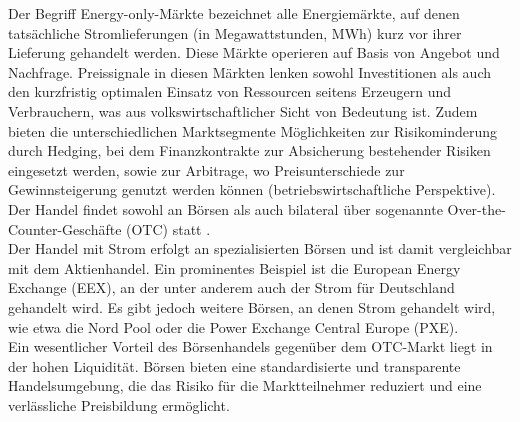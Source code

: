 Der Begriff Energy-only-Märkte bezeichnet alle Energiemärkte, auf denen tatsächliche Stromlieferungen (in Megawattstunden, MWh) kurz vor ihrer Lieferung gehandelt werden. Diese Märkte operieren auf Basis von Angebot und Nachfrage. Preissignale in diesen Märkten lenken sowohl Investitionen als auch den kurzfristig optimalen Einsatz von Ressourcen seitens Erzeugern und Verbrauchern, was aus volkswirtschaftlicher Sicht von Bedeutung ist. Zudem bieten die unterschiedlichen Marktsegmente Möglichkeiten zur Risikominderung durch Hedging, bei dem Finanzkontrakte zur Absicherung bestehender Risiken eingesetzt werden, sowie zur Arbitrage, wo Preisunterschiede zur Gewinnsteigerung genutzt werden können (betriebswirtschaftliche Perspektive). Der Handel findet sowohl an Börsen als auch bilateral über sogenannte Over-the-Counter-Geschäfte (OTC) statt \cite{VDI5207Blatt2020}.\\

Der Handel mit Strom erfolgt an spezialisierten Börsen und ist damit vergleichbar mit dem Aktienhandel. Ein prominentes Beispiel ist die European Energy Exchange (EEX), an der unter anderem auch der Strom für Deutschland gehandelt wird. Es gibt jedoch weitere Börsen, an denen Strom gehandelt wird, wie etwa die Nord Pool oder die Power Exchange Central Europe (PXE).\\

Ein wesentlicher Vorteil des Börsenhandels gegenüber dem OTC-Markt liegt in der hohen Liquidität. Börsen bieten eine standardisierte und transparente Handelsumgebung, die das Risiko für die Marktteilnehmer reduziert und eine verlässliche Preisbildung ermöglicht.\\

